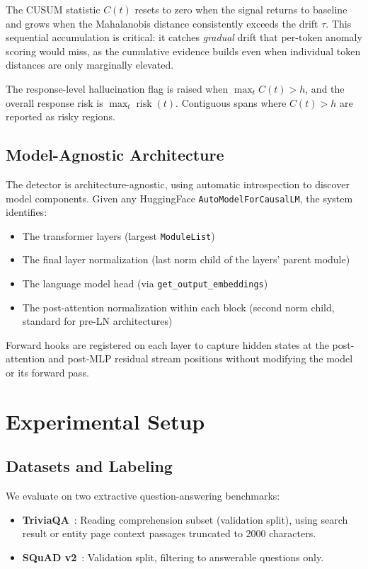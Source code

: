 \documentclass{article}
\begin{document}
The CUSUM statistic $C(t)$ resets to zero when the signal returns to baseline and grows when the Mahalanobis distance consistently exceeds the drift $\tau$. This sequential accumulation is critical: it catches \emph{gradual} drift that per-token anomaly scoring would miss, as the cumulative evidence builds even when individual token distances are only marginally elevated.

The response-level hallucination flag is raised when $\max_t C(t) > h$, and the overall response risk is $\max_t \operatorname{risk}(t)$. Contiguous spans where $C(t) > h$ are reported as risky regions.

\subsection{Model-Agnostic Architecture}
\label{sec:architecture}

The detector is architecture-agnostic, using automatic introspection to discover model components. Given any HuggingFace \texttt{AutoModelForCausalLM}, the system identifies:
\begin{itemize}
    \item The transformer layers (largest \texttt{ModuleList})
    \item The final layer normalization (last norm child of the layers' parent module)
    \item The language model head (via \texttt{get\_output\_embeddings})
    \item The post-attention normalization within each block (second norm child, standard for pre-LN architectures)
\end{itemize}
Forward hooks are registered on each layer to capture hidden states at the post-attention and post-MLP residual stream positions without modifying the model or its forward pass.


\section{Experimental Setup}
\label{sec:experiments}

\subsection{Datasets and Labeling}

We evaluate on two extractive question-answering benchmarks:
\begin{itemize}
    \item \textbf{TriviaQA}~\citep{joshi2017triviaqa}: Reading comprehension subset (validation split), using search result or entity page context passages truncated to 2000 characters.
    \item \textbf{SQuAD v2}~\citep{rajpurkar2018know}: Validation split, filtering to answerable questions only.
\end{itemize}
\end{document}
